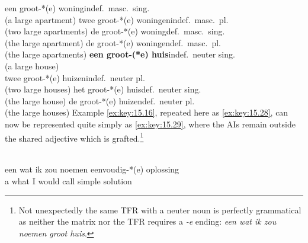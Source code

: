 \documentclass[output=paper]{langsci/langscibook}
\begin{document}
\begin{refcontext}
\ea\label{ex:key:15.27}
    \ea een groot-*(e) woning\hfill indef.\ masc.\ sing.\\
        (a large apartment)
    \ex twee groot-*(e) woningen\hfill indef.\ masc.\ pl.\\
        (two large apartments)
    \ex de groot-*(e) woning\hfill def.\ masc.\ sing.\\
        (the large apartment)
    \ex de groot-*(e) woningen\hfill def.\ masc.\ pl.\\
        (the large apartments)
    \ex \textbf{een groot-(*e) huis}\hfill indef.\ neuter sing.\\
        (a large house)\\
    \ex twee groot-*(e) huizen\hfill indef.\ neuter pl.\\
        (two large houses)
    \ex het groot-*(e) huis\hfill def.\ neuter sing.\\
        (the large house)
    \ex de groot-*(e) huizen\hfill def.\ neuter pl.\\
        (the large houses)
    \z
\z
Example \eqref{ex:key:15.16}, repeated here as \eqref{ex:key:15.28}, can now be represented quite simply as
\eqref{ex:key:15.29}, where the AIs remain outside the shared adjective which is
grafted.\footnote{Not unexpectedly the same \gls{TFR} with a neuter noun is
    perfectly grammatical as neither the matrix nor the \gls{TFR} requires a
\emph{-e} ending: \emph{een wat ik zou noemen groot huis}.}

\ea\label{ex:key:15.28}\\
    \gll    een wat    ik zou     noemen eenvoudig-*(e) oplossing  \\
            a      what I  would call         simple               solution\\
    \glt
\z

%



\end{refcontext}
\end{document}
